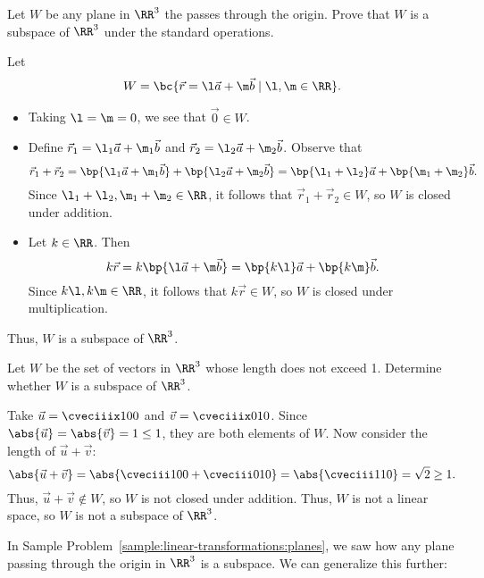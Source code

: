 \begin{sample}\label{sample:linear-transformations:planes}
    Let $W$ be any plane in $\RR^3$ the passes through the origin. Prove that $W$ is a subspace of $\RR^3$ under the standard operations.
\end{sample}
\begin{sampans}
    Let \[W = \bc{\vec r = \l \vec a + \m \vec b \mid \l, \m \in \RR}.\]
    \begin{itemize}
        \item Taking $\l = \m = 0$, we see that $\vec 0 \in W$.
        \item Define $\vec r_1 = \l_1 \vec a + \m_1 \vec b$ and $\vec r_2 = \l_2 \vec a + \m_2 \vec b$. Observe that \[\vec r_1 + \vec r_2 = \bp{\l_1 \vec a + \m_1 \vec b} + \bp{\l_2 \vec a + \m_2 \vec b} = \bp{\l_1 + \l_2} \vec a + \bp{\m_1 + \m_2} \vec b.\] Since $\l_1 + \l_2, \m_1 + \m_2 \in \RR$, it follows that $\vec r_1 + \vec r_2 \in W$, so $W$ is closed under addition.
        \item Let $k \in \RR$. Then \[k\vec r = k\bp{\l \vec a + \m \vec b} = \bp{k \l} \vec a + \bp{k \m} \vec b.\] Since $k\l, k\m \in \RR$, it follows that $k \vec r \in W$, so $W$ is closed under multiplication.
    \end{itemize}
    Thus, $W$ is a subspace of $\RR^3$.
\end{sampans}

\begin{sample}
    Let $W$ be the set of vectors in $\RR^3$ whose length does not exceed 1. Determine whether $W$ is a subspace of $\RR^3$.
\end{sample}
\begin{sampans}
    Take $\vec u = \cveciiix100$ and $\vec v = \cveciiix010$. Since $\abs{\vec u} = \abs{\vec v} = 1 \leq 1$, they are both elements of $W$. Now consider the length of $\vec u + \vec v$: \[\abs{\vec u + \vec v} = \abs{\cveciii100 + \cveciii010} = \abs{\cveciii110} = \sqrt{2} \geq 1.\] Thus, $\vec u + \vec v \notin W$, so $W$ is not closed under addition. Thus, $W$ is not a linear space, so $W$ is not a subspace of $\RR^3$.
\end{sampans}

In Sample Problem~\ref{sample:linear-transformations:planes}, we saw how any plane passing through the origin in $\RR^3$ is a subspace. We can generalize this further:

